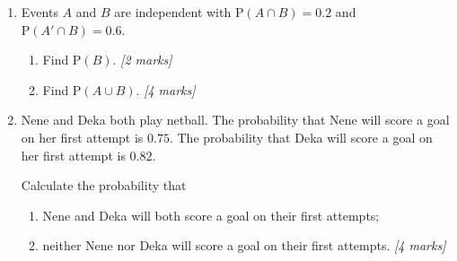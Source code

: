 \documentclass[12pt, twoside]{article}
\begin{document}
\begin{enumerate}
\begin{enumerate}[itemsep=1.5cm]
  \item
    \begin{enumerate}[label=(\roman*), itemsep=0.8cm]
      \item Write down the value of $q$.
      \item Find the value of $p$. \hfill \textit{[3 marks]}
    \end{enumerate}
  \item Find $\mathrm{P}(B)$. \hfill \textit{[3 marks]}
\end{enumerate}

\vspace{1cm}

\item Events $A$ and $B$ are independent with
$\mathrm{P}(A \cap B) = 0.2$ and $\mathrm{P}(A' \cap B) = 0.6$.

\begin{enumerate}[itemsep=2cm]
  \item Find $\mathrm{P}(B)$. \hfill \textit{[2 marks]}
  \item Find $\mathrm{P}(A \cup B)$. \hfill \textit{[4 marks]}
\end{enumerate}

\vspace{1cm}

\item Nene and Deka both play netball. The probability that Nene will score a goal on her first attempt
is $0.75$. The probability that Deka will score a goal on her first attempt is $0.82$.

Calculate the probability that

\begin{enumerate}[itemsep=2cm]
  \item Nene and Deka will both score a goal on their first attempts;
  \item neither Nene nor Deka will score a goal on their first attempts. \hfill \textit{[4 marks]}
\end{enumerate}

\end{enumerate}
\end{document}
